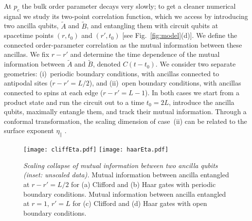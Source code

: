 \documentclass[prl,twocolumn,aps,showpacs,amsmath,amssymb,superscriptaddress,floatfix,longbibliography]{revtex4-1}
\begin{document}
At $p_c$ the bulk order parameter decays very slowly; to get a cleaner numerical signal we study its two-point correlation function, which we access by introducing two ancilla qubits, $\tilde A$ and $\tilde B$, and entangling them with circuit qubits at spacetime points $(r,t_0)$ and $(r',t_0)$ [see Fig.~\ref{fig:model}(d)]. We define the connected order-parameter correlation as the mutual information between these ancillas. We fix $r-r'$ and determine the time dependence of the mutual information between $\tilde A$ and $\tilde B$, denoted $C(t - t_0)$. We consider two separate geometries: (i)~periodic boundary conditions, with ancillas connected to antipodal sites ($r-r' = L/2$), and (ii)~open boundary conditions, with ancillas connected to spins at each edge ($r-r'=L-1$). In both cases we start from a product state and run the circuit out to a time $t_0=2L$, introduce the ancilla qubits, maximally entangle them, and track their mutual information. Through a conformal transformation, the scaling dimension of case~(ii) can be related to the surface exponent $\eta_\parallel$ \cite{suppmat}.

\begin{figure}[tb]
\centering
           \texttt{[image: cliffEta.pdf]}
           \texttt{[image: haarEta.pdf]}
   \caption{\emph{Scaling collapse of mutual information between two ancilla qubits (inset: unscaled data).} Mutual information between ancilla entangled at $r-r' = L/2$ for (a) Clifford and (b) Haar gates with periodic boundary conditions. Mutual information between ancilla entangled at $r=1$, $r' = L$ for (c) Clifford and (d) Haar gates with open boundary conditions.}
  \label{fig:eta}
\end{figure}
\end{document}
